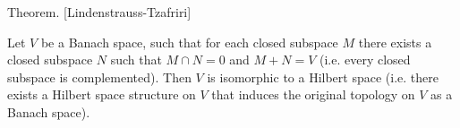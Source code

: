 \documentclass[12pt]{article}
\begin{document}
Theorem. [Lindenstrauss-Tzafriri]

Let $V$ be a Banach space, such that for each closed subspace $M$ there exists a closed subspace $N$ such that $M\cap N=0$ and $M+N=V$ (i.e. every closed subspace is complemented). Then $V$ is isomorphic to a Hilbert space (i.e. there exists a Hilbert space structure on $V$ that induces the original topology on $V$ as a Banach space).
\end{document}
